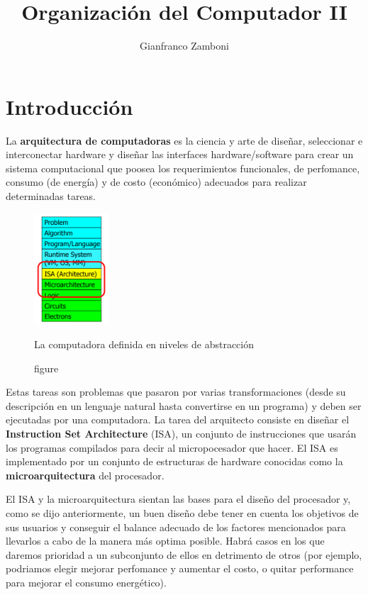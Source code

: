 

\title{Organización del Computador II}
\author{Gianfranco Zamboni}



\newcommand{\red}[1]{{\color{red}#1}}  			%

	\maketitle
	\tableofcontents
	\newpage

\section{Introducción}

La \textbf{arquitectura de computadoras} es la ciencia y arte de diseñar, seleccionar e interconectar hardware y diseñar las interfaces hardware/software para crear un sistema computacional que poosea los requerimientos funcionales, de perfomance, consumo (de energía) y de costo (económico) adecuados para realizar determinadas tareas.

\begin{figure}
	\centering
	\includegraphics[width=0.25\textwidth]{imagenes/arquitectura}
	\caption{figure}{La computadora definida en niveles de abstracción}
	\label{fig:arquitectura}
\end{figure}

Estas tareas son problemas que pasaron por varias transformaciones (desde su descripción en un lenguaje natural hasta convertirse en un programa) y deben ser ejecutadas por una computadora. La tarea del arquitecto consiste en diseñar el \textbf{Instruction Set Architecture} (ISA), un conjunto de instrucciones que usarán los programas compilados para decir al micropocesador que hacer. El ISA es implementado por un conjunto de estructuras de hardware conocidas como la \textbf{microarquitectura} del procesador.

El ISA y la microarquitectura sientan las bases para el diseño del procesador y, como se dijo anteriormente, un buen diseño debe tener en cuenta los objetivos de sus usuarios y conseguir el balance adecuado de los factores mencionados para llevarlos a cabo de la manera más optima posible. Habrá casos en los que daremos prioridad a un subconjunto de ellos en detrimento de otros (por ejemplo, podriamos elegir mejorar perfomance y aumentar el costo, o quitar performance para mejorar el consumo energético).

